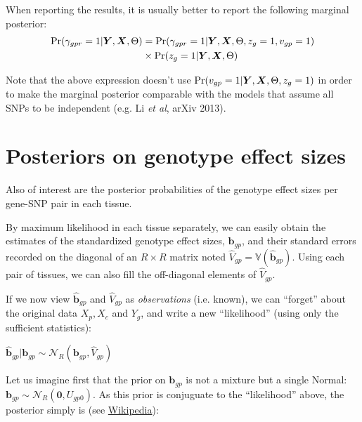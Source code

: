 \documentclass[10pt]{article}
\newcommand{\Prob}{\Pr} %
\newcommand{\Var}{\mathbb{V}} %
\newcommand{\Norm}{{\mathcal{N}}} %
\newcommand{\Xv}{\mbox{\boldmath$X$}}
\newcommand{\Yv}{\mbox{\boldmath$Y$}}
\begin{document}
When reporting the results, it is usually better to report the following marginal posterior:
\begin{equation}
  \begin{aligned}
    \Prob(\gamma_{gpr} = 1 | \Yv, \Xv, \Theta) &= \Prob(\gamma_{gpr} = 1 | \Yv, \Xv, \Theta, z_g = 1, v_{gp} = 1) \\
    &\times \Prob(z_g = 1 | \Yv, \Xv, \Theta)
  \end{aligned}
\end{equation}

Note that the above expression doesn't use $\Prob(v_{gp} = 1 | \Yv, \Xv, \Theta, z_g = 1)$ in order to make the marginal posterior comparable with the models that assume all SNPs to be independent (e.g. Li \textit{et al}, arXiv 2013).



\section{Posteriors on genotype effect sizes}

Also of interest are the posterior probabilities of the genotype effect sizes per gene-SNP pair in each tissue.

By maximum likelihood in each tissue separately, we can easily obtain the estimates of the standardized genotype effect sizes, $\hat{\bm{b}}_{gp}$, and their standard errors recorded on the diagonal of an $R \times R$ matrix noted $\hat{V}_{gp} = \Var(\hat{\bm{b}}_{gp})$.
Using each pair of tissues, we can also fill the off-diagonal elements of $\hat{V}_{gp}$.

If we now view $\hat{\bm{b}}_{gp}$ and $\hat{V}_{gp}$ as \emph{observations} (i.e. known), we can ``forget'' about the original data $X_p,X_c$ and $Y_g$, and  write a new ``likelihood'' (using only the sufficient statistics):

$\hat{\bm{b}}_{gp} | \bm{b}_{gp} \sim \Norm_R(\bm{b}_{gp}, \hat{V}_{gp})$


Let us imagine first that the prior on $\bm{b}_{gp}$ is not a mixture but a single Normal: $\bm{b}_{gp} \sim \Norm_R(\bm{0}, U_{gp0})$.
As this prior is conjuguate to the ``likelihood'' above, the posterior simply is (see \href{http://en.wikipedia.org/wiki/Conjugate_prior#Continuous_distributions}{Wikipedia}):
\end{document}
